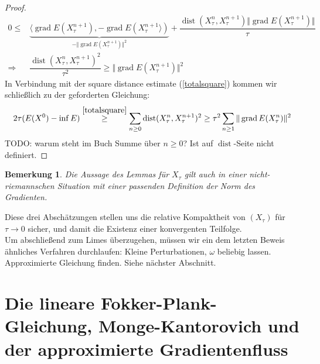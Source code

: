 \documentclass[11pt,a4paper,notitlepage]{scrreprt}
\newcommand{\dist}{\operatorname{dist}}
\newcommand{\grad}{\operatorname{grad}}
\newtheorem{bem}[defi]{Bemerkung}
\begin{document}
\begin{proof}
\begin{align*}
0\leq& \underset{-\Vert \grad E(X_\tau^{n+1}) \Vert^2}{\underbrace{\langle \grad E(X_\tau^{n+1}),-\grad E(X_\tau^{n+1}\rangle)}}+\dfrac{\dist(X_\tau^n,X_\tau^{n+1})\Vert \grad E(X_\tau^{n+1}) \Vert}{\tau}\\
\Rightarrow& \dfrac{\dist(X_\tau^n,X_\tau^{n+1})^2}{\tau^2} \geq \Vert \grad E(X_\tau^{n+1}) \Vert^2
\end{align*}
In Verbindung mit der square distance estimate (\ref{totalsquare}) kommen wir schließlich zu der geforderten Gleichung:
\begin{equation}
 2\tau (E(X^0)-\inf E)\overset{\ref{totalsquare}}\geq \sum_{n\geq 0} \dist(X_\tau^n,X_\tau^{n+1})^2 \geq \tau^2 \sum_{n\geq 1} \Vert \grad E(X_\tau^n)\Vert^2
\end{equation}
TODO: warum steht im Buch Summe über $n\geq 0$? Ist auf $\dist$-Seite nicht definiert.
\end{proof}
\begin{bem}
Die Aussage des Lemmas für $X_\tau$ gilt auch in einer nicht-riemannschen Situation mit einer passenden Definition der Norm des Gradienten. 
\end{bem}

Diese drei Abschätzungen stellen uns die relative Kompaktheit von $(X_\tau)$ für $\tau \to 0$ sicher, und damit die Existenz einer konvergenten Teilfolge.  \\
Um abschließend zum Limes überzugehen, müssen wir ein dem letzten Beweis ähnliches Verfahren durchlaufen: Kleine Perturbationen, $\omega$ beliebig lassen. Approximierte Gleichung finden. Siehe nächster Abschnitt. 


\section{Die lineare Fokker-Plank-Gleichung, Monge-Kantorovich und der approximierte Gradientenfluss}
\end{document}

